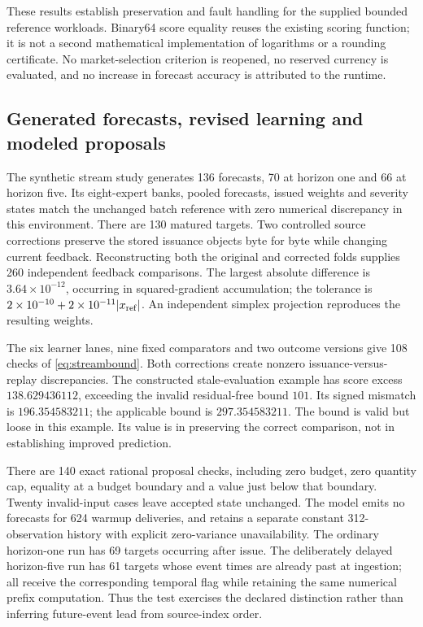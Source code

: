 \documentclass[11pt,a4paper]{article}
\theoremstyle{definition}\newtheorem{definition}[theorem]{Definition}
\begin{document}
These results establish preservation and fault handling for the supplied bounded reference workloads. Binary64 score equality reuses the existing scoring function; it is not a second mathematical implementation of logarithms or a rounding certificate. No market-selection criterion is reopened, no reserved currency is evaluated, and no increase in forecast accuracy is attributed to the runtime.

\subsection{Generated forecasts, revised learning and modeled proposals}\label{sec:streamresults}
The synthetic stream study generates 136 forecasts, 70 at horizon one and 66 at horizon five. Its eight-expert banks, pooled forecasts, issued weights and severity states match the unchanged batch reference with zero numerical discrepancy in this environment. There are 130 matured targets. Two controlled source corrections preserve the stored issuance objects byte for byte while changing current feedback. Reconstructing both the original and corrected folds supplies 260 independent feedback comparisons. The largest absolute difference is $3.64\times10^{-12}$, occurring in squared-gradient accumulation; the tolerance is $2\times10^{-10}+2\times10^{-11}|x_{\rm ref}|$. An independent simplex projection reproduces the resulting weights.

The six learner lanes, nine fixed comparators and two outcome versions give 108 checks of \eqref{eq:streambound}. Both corrections create nonzero issuance-versus-replay discrepancies. The constructed stale-evaluation example has score excess $138.629436112$, exceeding the invalid residual-free bound $101$. Its signed mismatch is $196.354583211$; the applicable bound is $297.354583211$. The bound is valid but loose in this example. Its value is in preserving the correct comparison, not in establishing improved prediction.

There are 140 exact rational proposal checks, including zero budget, zero quantity cap, equality at a budget boundary and a value just below that boundary. Twenty invalid-input cases leave accepted state unchanged. The model emits no forecasts for 624 warmup deliveries, and retains a separate constant 312-observation history with explicit zero-variance unavailability. The ordinary horizon-one run has 69 targets occurring after issue. The deliberately delayed horizon-five run has 61 targets whose event times are already past at ingestion; all receive the corresponding temporal flag while retaining the same numerical prefix computation. Thus the test exercises the declared distinction rather than inferring future-event lead from source-index order.
\end{document}
